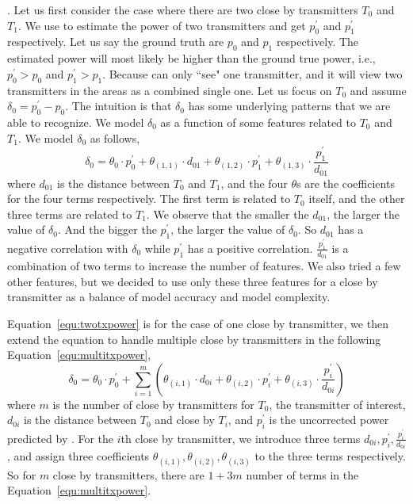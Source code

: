 .
Let us first consider the case where there are two close by transmitters $T_0$ and $T_1$. We use \power to estimate the power of two transmitters and get $p_0^{'}$ and $p_1^{'}$ respectively.
Let us say the ground truth are $p_0$ and $p_1$ respectively.
The estimated power will most likely be higher than the ground true power, i.e., $p_0^{'} > p_0$ and $p_1^{'} > p_1$.
Because \power can only ``see" one transmitter, and it will view two transmitters in the areas as a combined single one.
Let us focus on $T_0$  and assume $\delta_0 = p_0^{'} - p_0$.
The intuition is that $\delta_0$ has some underlying patterns that we are able to recognize.
We model $\delta_0$ as a function of some features related to $T_0$ and $T_1$.
We model $\delta_0$ as follows,
\begin{equation}
  \delta_0 =   \theta_0 \cdot p_0^{'} + \theta_{(1,1)} \cdot d_{01} + \theta_{(1,2)} \cdot p_1^{'} + \theta_{(1,3)} \cdot \frac{p_1^{'}}{d_{01}} 
  \label{equ:twotxpower}
\end{equation}
where $d_{01}$ is the distance between $T_0$ and $T_1$, and the four $\theta$s are the coefficients for the four terms respectively.
The first term is related to $T_0$ itself, and the other three terms are related to $T_1$.
We observe that the smaller the $d_{01}$, the larger the value of $\delta_0$.
And the bigger the $p_{1}^{'}$, the larger the value of $\delta_0$.
So $d_{01}$ has a negative correlation with $\delta_0$ while $p_{1}^{'}$ has a positive correlation.
$\frac{p_1^{'}}{d_{01}}$ is a combination of two terms to increase the number of features.
We also tried a few other features, but we decided to use only these three features for a close by transmitter as a balance of model accuracy and model complexity.

Equation~\ref{equ:twotxpower} is for the case of one close by transmitter, we then extend the equation to handle multiple close by transmitters in the following Equation~\ref{equ:multitxpower},
\begin{equation}
  \delta_0 =  \theta_0 \cdot p_0^{'} + \sum_{i=1}^{m} ( \theta_{(i,1)} \cdot d_{0i} + \theta_{(i,2)} \cdot p_i^{'} + \theta_{(i,3)} \cdot \frac{p_i^{'}}{d_{0i}})
  \label{equ:multitxpower}
\end{equation}
where $m$ is the number of close by transmitters for $T_0$, the transmitter of interest, $d_{0i}$ is the distance between $T_0$ and close by $T_i$, and $p_i^{'}$ is the uncorrected power predicted by \power. 
For the $i$th close by transmitter, we introduce three terms $ d_{0i},  p_i^{'}, \frac{p_i^{'}}{d_{0i}}$, and assign three coefficients $ \theta_{(i,1)}, \theta_{(i,2)}, \theta_{(i,3)}$ to the three terms respectively.
So for $m$ close by transmitters, there are $1 + 3m$ number of terms in the Equation~\ref{equ:multitxpower}.

